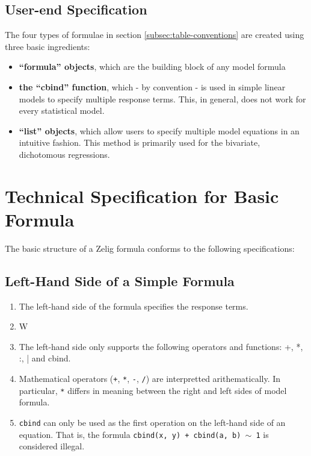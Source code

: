 \documentclass{article}
\newcommand{\tweedly}[0]{$\sim${ }}
\begin{document}
\subsection{User-end Specification}
\label{subsec:user-spec-formula}

The four types of formulae in section \ref{subsec:table-conventions} are created
using three basic ingredients:

\begin{itemize}

  \item {\bf ``formula'' objects}, which are the building block of any model
    formula

  \item {\bf the ``cbind'' function}, which - by convention - is used in simple
    linear models to specify multiple response terms. This, in general, does not
    work for every statistical model.

  \item {\bf ``list'' objects}, which allow users to specify multiple
    model equations in an intuitive fashion. This method is primarily used for
    the bivariate, dichotomous regressions.

\end{itemize}


\pagebreak


%
%
%
\section{Technical Specification for Basic Formula}

The basic structure of a Zelig formula conforms to the following specifications:

\subsection{Left-Hand Side of a Simple Formula}
\label{subsec:lhs}

\begin{enumerate}

  \item The left-hand side of the formula specifies the response terms.

  \item W

  \item The left-hand side only supports the following operators and functions:
    +, *, :, | and cbind.


  \item Mathematical operators (\verb|+|, \verb|*|, \verb|-|, \verb|/|) are
    interpretted arithematically. In particular, \verb|*| differs in meaning
    between the right and left sides of model formula.

  \item \verb|cbind| can only be used as the first operation on the left-hand side
    of an equation. That is, the formula
    {\tt cbind(x, y) + cbind(a, b) \tweedly 1} is considered illegal.

\end{enumerate}
\end{document}

